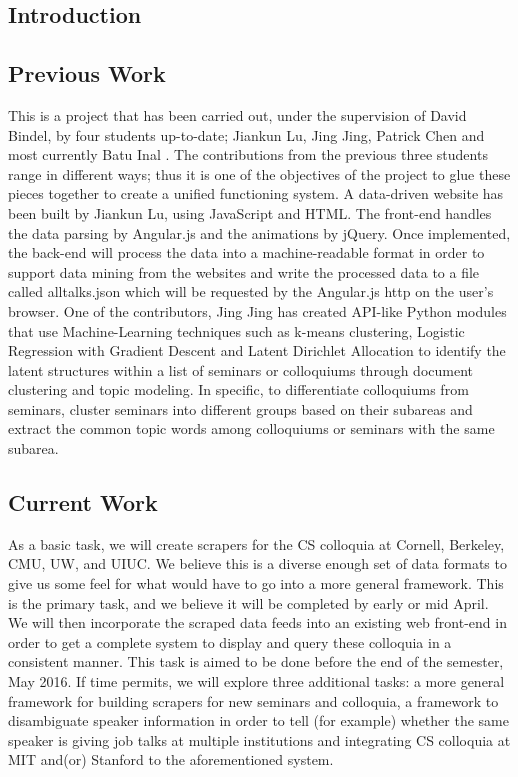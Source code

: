\documentclass[a4paper,11pt]{article}
\begin{document}
\begin{multicols}{2}
\section{Introduction}
\subsection{Previous Work}
This is a project that has been carried out, under the supervision of David Bindel,  by four students up-to-date; Jiankun Lu, Jing Jing, Patrick Chen and most currently Batu Inal . The contributions from the previous three students range in different ways; thus it is one of the objectives of the project to glue these pieces together to create a unified functioning system. A data-driven website has been built by Jiankun Lu, using JavaScript and HTML. The front-end handles the data parsing by Angular.js and the animations by jQuery. Once implemented, the back-end will process the data into a machine-readable format in order to support data mining from the websites and write the processed data to a file called alltalks.json which will be requested by the Angular.js http on the user's browser. One of the contributors, Jing Jing has created API-like Python modules that use Machine-Learning techniques such as k-means clustering, Logistic Regression with Gradient Descent and Latent Dirichlet Allocation to identify the latent structures within a list of seminars or colloquiums through document clustering and topic modeling. In specific, to differentiate colloquiums from seminars, cluster seminars into different groups based on their subareas and extract the common topic words among colloquiums or seminars with the same subarea.
\subsection{Current Work} 
As a basic task, we will create scrapers for the CS colloquia at Cornell, Berkeley, CMU, UW, and UIUC.  We believe this is a diverse enough set of data formats to give us some feel for what would have to go into a more general framework.  This is the primary task, and we believe it will be completed by early or mid April. We will then incorporate the scraped data feeds into an existing web front-end in order to get a complete system to display and query these colloquia in a consistent manner.  This task is aimed to be done before the end of the semester, May 2016. If time permits, we will explore three additional tasks: a more general framework for building scrapers for new seminars and colloquia, a framework to disambiguate speaker information in order to tell (for example) whether the same speaker is giving job talks at multiple institutions and integrating CS colloquia at MIT and(or) Stanford to the aforementioned system.
\end{multicols}
\end{document}

